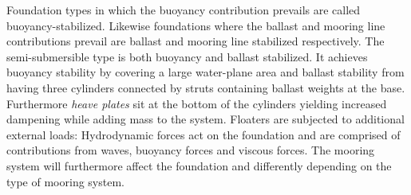 Foundation types in which the buoyancy contribution prevails are called buoyancy-stabilized. Likewise foundations where the ballast and mooring line contributions prevail are ballast and mooring line stabilized respectively. The semi-submersible type is both buoyancy and ballast stabilized. It achieves buoyancy stability by covering a large water-plane area and ballast stability from having three cylinders connected by struts containing ballast weights at the base. Furthermore \textit{heave plates} sit at the bottom of the cylinders yielding increased dampening while adding mass to the system.
Floaters are subjected to additional external loads: Hydrodynamic forces act on the foundation and are comprised of contributions from waves, buoyancy forces and viscous forces. The mooring system will furthermore affect the foundation and differently depending on the type of mooring system.\\

